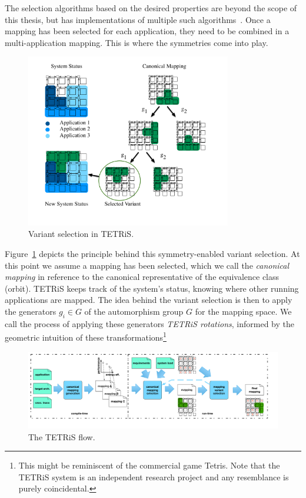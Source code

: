 The selection algorithms based on the desired properties are beyond the scope of this thesis, but \mocasin has implementations of multiple such algorithms~\cite{khasanov_date20}.
Once a mapping has been selected for each application, they need to be combined in a multi-application mapping.
This is where the symmetries come into play. 

\begin{figure}[th]
	\centering
	\includegraphics[width=0.8\textwidth]{figures/Variant_Selection.pdf}
	\caption{Variant selection in \ac{TETRiS}.}
	\label{fig:tetris_variant_selection}
\end{figure}

Figure~\ref{fig:tetris_variant_selection} depicts the principle behind this symmetry-enabled variant selection.
At this point we assume a mapping has been selected, which we call the \emph{canonical mapping} in reference to the canonical representative of the equivalence class (orbit).
\ac{TETRiS} keeps track of the system's status, knowing where other running applications are mapped.
The idea behind the variant selection is then to apply the generators $g_i \in G$ of the automorphism group $G$ for the mapping space. 
We call the process of applying these generators \emph{\ac{TETRiS} rotations}, informed by the geometric intuition of these transformations\footnote{This might be reminiscent of the commercial game Tetris. Note that the \ac{TETRiS} system is an independent research project and any resemblance is purely coincidental.}

\begin{figure}[th]
	\centering
	\includegraphics[width=1.00\textwidth]{figures/tetris_flow.pdf}
	\caption{The \ac{TETRiS} flow.}
	\label{fig:tetris_flow}
\end{figure}

